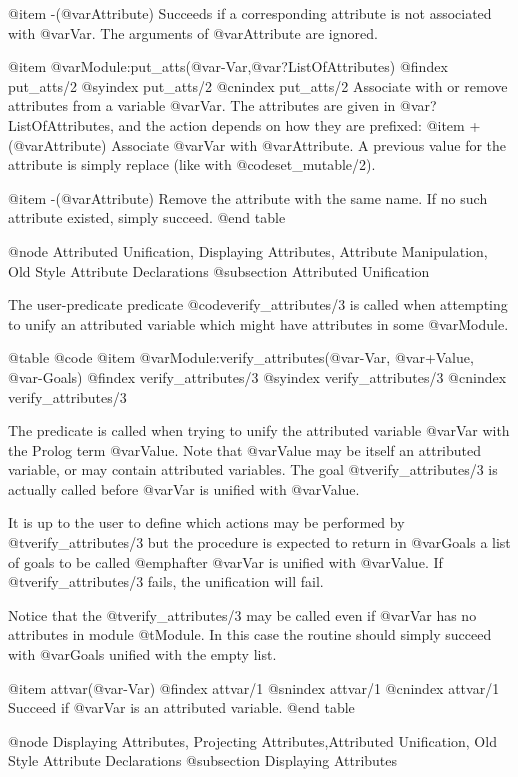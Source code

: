 {{{{{{{{{@item -(@var{Attribute})
Succeeds if a corresponding attribute is not associated with
@var{Var}. The arguments of @var{Attribute} are ignored.

@item @var{Module}:put_atts(@var{-Var},@var{?ListOfAttributes})
@findex put_atts/2
@syindex put_atts/2
@cnindex put_atts/2
Associate with or remove attributes from a variable @var{Var}. The
attributes are given in @var{?ListOfAttributes}, and the action depends
on how they are prefixed:
@item +(@var{Attribute})
Associate @var{Var} with @var{Attribute}. A previous value for the
attribute is simply replace (like with @code{set_mutable/2}).

@item -(@var{Attribute})
Remove the attribute with the same name. If no such attribute existed,
simply succeed.
@end table

@node Attributed Unification, Displaying Attributes, Attribute Manipulation, Old Style Attribute Declarations
@subsection Attributed Unification

The user-predicate predicate @code{verify_attributes/3} is called when
attempting to unify an attributed variable which might have attributes
in some @var{Module}.

@table @code
@item @var{Module}:verify_attributes(@var{-Var}, @var{+Value}, @var{-Goals})
@findex verify_attributes/3
@syindex verify_attributes/3
@cnindex verify_attributes/3

The predicate is called when trying to unify the attributed variable
@var{Var} with the Prolog term @var{Value}. Note that @var{Value} may be
itself an attributed variable, or may contain attributed variables.  The
goal @t{verify_attributes/3} is actually called before @var{Var} is
unified with @var{Value}.

It is up to the user to define which actions may be performed by
@t{verify_attributes/3} but the procedure is expected to return in
@var{Goals} a list of goals to be called @emph{after} @var{Var} is
unified with @var{Value}. If @t{verify_attributes/3} fails, the
unification will fail.

Notice that the @t{verify_attributes/3} may be called even if @var{Var}
has no attributes in module @t{Module}. In this case the routine should
simply succeed with @var{Goals} unified with the empty list.

@item attvar(@var{-Var})
@findex attvar/1
@snindex attvar/1
@cnindex attvar/1
Succeed if @var{Var} is an attributed variable.
@end table



@node Displaying Attributes, Projecting Attributes,Attributed Unification, Old Style Attribute Declarations 
@subsection Displaying Attributes

}}}}}}}}}
